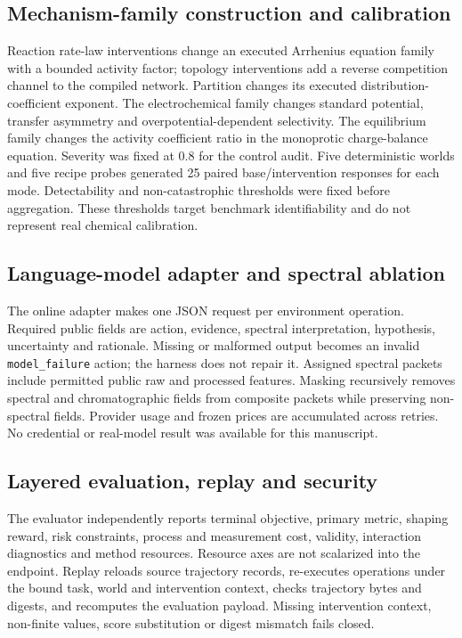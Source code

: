 \documentclass[11pt]{article}
\begin{document}
\subsection*{Mechanism-family construction and calibration}

Reaction rate-law interventions change an executed Arrhenius equation family with a bounded activity factor; topology interventions add a reverse competition channel to the compiled network. Partition changes its executed distribution-coefficient exponent. The electrochemical family changes standard potential, transfer asymmetry and overpotential-dependent selectivity. The equilibrium family changes the activity coefficient ratio in the monoprotic charge-balance equation. Severity was fixed at 0.8 for the control audit. Five deterministic worlds and five recipe probes generated 25 paired base/intervention responses for each mode. Detectability and non-catastrophic thresholds were fixed before aggregation. These thresholds target benchmark identifiability and do not represent real chemical calibration.

\subsection*{Language-model adapter and spectral ablation}

The online adapter makes one JSON request per environment operation. Required public fields are action, evidence, spectral interpretation, hypothesis, uncertainty and rationale. Missing or malformed output becomes an invalid \texttt{model\_failure} action; the harness does not repair it. Assigned spectral packets include permitted public raw and processed features. Masking recursively removes spectral and chromatographic fields from composite packets while preserving non-spectral fields. Provider usage and frozen prices are accumulated across retries. No credential or real-model result was available for this manuscript.

\subsection*{Layered evaluation, replay and security}

The evaluator independently reports terminal objective, primary metric, shaping reward, risk constraints, process and measurement cost, validity, interaction diagnostics and method resources. Resource axes are not scalarized into the endpoint. Replay reloads source trajectory records, re-executes operations under the bound task, world and intervention context, checks trajectory bytes and digests, and recomputes the evaluation payload. Missing intervention context, non-finite values, score substitution or digest mismatch fails closed.
\end{document}
